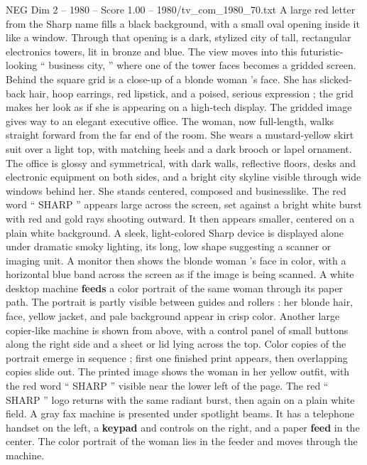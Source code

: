\begin{textsample}{NEG Dim 2 – 1980 – Score 1.00 – 1980/tv\_com\_1980\_70.txt}  \label{ex:f2_neg_039}
A large red letter from the Sharp name fills a black background, with a small oval opening inside it like a window.
Through that opening is a dark, stylized city of tall, rectangular electronics towers, lit in bronze and blue.
The view moves into this futuristic-looking “ business city, ” where one of the tower faces becomes a gridded screen.
Behind the square grid is a close-up of a blonde woman ’s face.
She has slicked-back hair, hoop earrings, red lipstick, and a poised, serious expression ; the grid makes her look as if she is appearing on a high-tech display.
The gridded image gives way to an elegant executive office.
The woman, now full-length, walks straight forward from the far end of the room.
She wears a mustard-yellow skirt suit over a light top, with matching heels and a dark brooch or lapel ornament.
The office is glossy and symmetrical, with dark walls, reflective floors, desks and electronic equipment on both sides, and a bright city skyline visible through wide windows behind her.
She stands centered, composed and businesslike.
The red word “ SHARP ” appears large across the screen, set against a bright white burst with red and gold rays shooting outward.
It then appears smaller, centered on a plain white background.
A sleek, light-colored Sharp device is displayed alone under dramatic smoky lighting, its long, low shape suggesting a scanner or imaging unit.
A monitor then shows the blonde woman ’s face in color, with a horizontal blue band across the screen as if the image is being scanned.
A white desktop machine \textbf{feeds} a color portrait of the same woman through its paper path.
The portrait is partly visible between guides and rollers : her blonde hair, face, yellow jacket, and pale background appear in crisp color.
Another large copier-like machine is shown from above, with a control panel of small buttons along the right side and a sheet or lid lying across the top.
Color copies of the portrait emerge in sequence ; first one finished print appears, then overlapping copies slide out.
The printed image shows the woman in her yellow outfit, with the red word “ SHARP ” visible near the lower left of the page.
The red “ SHARP ” logo returns with the same radiant burst, then again on a plain white field.
A gray fax machine is presented under spotlight beams.
It has a telephone handset on the left, a \textbf{keypad} and controls on the right, and a paper \textbf{feed} in the center.
The color portrait of the woman lies in the feeder and moves through the machine.

\end{textsample}
